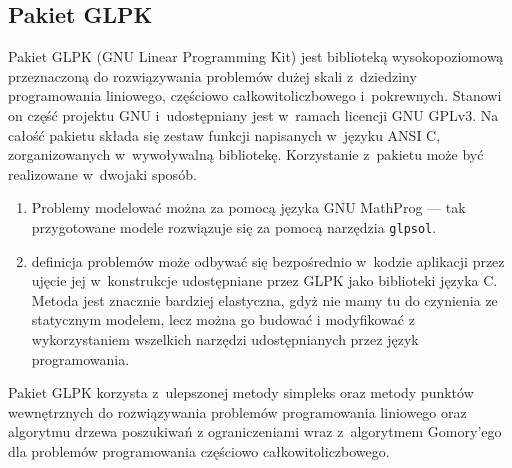 \subsection{Pakiet GLPK} %
\label{ss_internals_glpk}
\par{
  Pakiet GLPK (GNU Linear Programming Kit) jest biblioteką wysokopoziomową przeznaczoną do rozwiązywania problemów dużej skali z~dziedziny programowania liniowego, częściowo całkowitoliczbowego i~pokrewnych.
  Stanowi on część projektu GNU i~udostępniany jest w~ramach licencji GNU GPLv3.
  Na całość pakietu składa się zestaw funkcji napisanych w~języku ANSI C, zorganizowanych w~wywoływalną bibliotekę.
  Korzystanie z~pakietu może być realizowane w~dwojaki sposób.
  \begin{enumerate}
    \item Problemy modelować można za pomocą języka GNU MathProg --- tak przygotowane modele rozwiązuje się za pomocą narzędzia \texttt{glpsol}.
    \item definicja problemów może odbywać się bezpośrednio w~kodzie aplikacji przez ujęcie jej w~konstrukcje udostępniane przez GLPK jako biblioteki języka C. Metoda jest znacznie bardziej elastyczna, gdyż nie mamy tu do czynienia ze statycznym modelem, lecz można go budować i modyfikować z wykorzystaniem wszelkich narzędzi udostępnianych przez język programowania.
  \end{enumerate}
}
\par{
  Pakiet GLPK korzysta z~ulepszonej metody simpleks oraz metody punktów wewnętrznych do rozwiązywania problemów programowania liniowego oraz algorytmu drzewa poszukiwań z ograniczeniami wraz z~algorytmem Gomory'ego dla problemów programowania częściowo całkowitoliczbowego.
}
